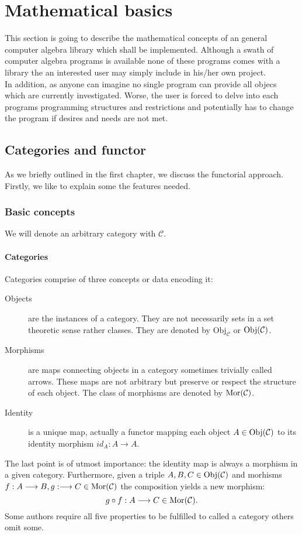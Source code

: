 \section{Mathematical basics}
This section is going to describe the mathematical concepts of an general computer algebra library which shall be implemented. Although a swath of computer algebra programs is available none of these programs comes with a library the an interested user may simply include in his/her own project.\\
\indent In addition, as anyone can imagine no single program can provide all objecs which are currently investigated. Worse, the user is forced to delve into each programs programming structures and restrictions and potentially has to change the program if desires and needs are not met.
\subsection{Categories and functor}
As we briefly outlined in the first chapter, we discuss the functorial approach. Firstly, we like to explain some the features needed.
\subsubsection{Basic concepts}
We will denote an arbitrary category with $\mathcal{C}$.
\paragraph{Categories} Categories comprise of three concepts or data encoding it:
\begin{description}
\item[Objects] are the instances of a category. They are not necessarily sets in a set theoretic sense rather classes. They are denoted by $\mathrm{Obj}_{\mathcal{C}}$ or $\mathrm{Obj}({\mathcal{C}})$.
\item[Morphisms] are maps connecting objects in a category sometimes trivially called arrows. These maps are not arbitrary but preserve or respect the structure of each object. The class of morphisms are denoted by $\mathrm{Mor}(\mathcal{C})$.
\item[Identity] is a unique map, actually a functor mapping each object $A \in \mathrm{Obj}({\mathcal{C}})$ to its identity morphism $id_A : A \longrightarrow A$.
\end{description}
The last point is of utmost importance: the identity map is always a morphism in a given category. Furthermore, given a triple $A, B, C \in \mathrm{Obj}({\mathcal{C}})$ and morhisms $f : A \longrightarrow B, g : \longrightarrow C \in \mathrm{Mor}(\mathcal{C})$ the composition yields a new morphism:
$$g \circ f : A \longrightarrow C \in \mathrm{Mor}(\mathcal{C}).$$
Some authors require all five properties to be fulfilled to called a category others omit some.
